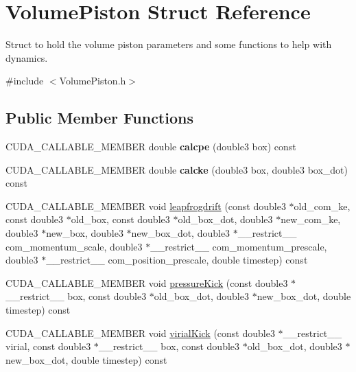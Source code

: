 \hypertarget{structVolumePiston}{}\section{Volume\+Piston Struct Reference}
\label{structVolumePiston}


Struct to hold the volume piston parameters and some functions to help with dynamics.  




{\ttfamily \#include $<$Volume\+Piston.\+h$>$}

\subsection*{Public Member Functions}
\begin{DoxyCompactItemize}
\item 
\hypertarget{structVolumePiston_a739d6b6559f8e7861ed9f606e87cc2d9}{}\label{structVolumePiston_a739d6b6559f8e7861ed9f606e87cc2d9} 
C\+U\+D\+A\+\_\+\+C\+A\+L\+L\+A\+B\+L\+E\+\_\+\+M\+E\+M\+B\+ER double {\bfseries calcpe} (double3 box) const
\item 
\hypertarget{structVolumePiston_ac699322cd986cf421e79efc1bbedc45c}{}\label{structVolumePiston_ac699322cd986cf421e79efc1bbedc45c} 
C\+U\+D\+A\+\_\+\+C\+A\+L\+L\+A\+B\+L\+E\+\_\+\+M\+E\+M\+B\+ER double {\bfseries calcke} (double3 box, double3 box\+\_\+dot) const
\item 
C\+U\+D\+A\+\_\+\+C\+A\+L\+L\+A\+B\+L\+E\+\_\+\+M\+E\+M\+B\+ER void \hyperlink{structVolumePiston_a771864206ceef0f0ae6c07e1639a8d71}{leapfrogdrift} (const double3 $\ast$old\+\_\+com\+\_\+ke, const double3 $\ast$old\+\_\+box, const double3 $\ast$old\+\_\+box\+\_\+dot, double3 $\ast$new\+\_\+com\+\_\+ke, double3 $\ast$new\+\_\+box, double3 $\ast$new\+\_\+box\+\_\+dot, double3 $\ast$\+\_\+\+\_\+restrict\+\_\+\+\_\+ com\+\_\+momentum\+\_\+scale, double3 $\ast$\+\_\+\+\_\+restrict\+\_\+\+\_\+ com\+\_\+momentum\+\_\+prescale, double3 $\ast$\+\_\+\+\_\+restrict\+\_\+\+\_\+ com\+\_\+position\+\_\+prescale, double timestep) const
\item 
C\+U\+D\+A\+\_\+\+C\+A\+L\+L\+A\+B\+L\+E\+\_\+\+M\+E\+M\+B\+ER void \hyperlink{structVolumePiston_ae2ae90b94c4f05a5338a2599a5e12f96}{pressure\+Kick} (const double3 $\ast$\+\_\+\+\_\+restrict\+\_\+\+\_\+ box, const double3 $\ast$old\+\_\+box\+\_\+dot, double3 $\ast$new\+\_\+box\+\_\+dot, double timestep) const
\item 
C\+U\+D\+A\+\_\+\+C\+A\+L\+L\+A\+B\+L\+E\+\_\+\+M\+E\+M\+B\+ER void \hyperlink{structVolumePiston_ab1d3d87cae459ab285f52c694cfa35f0}{virial\+Kick} (const double3 $\ast$\+\_\+\+\_\+restrict\+\_\+\+\_\+ virial, const double3 $\ast$\+\_\+\+\_\+restrict\+\_\+\+\_\+ box, const double3 $\ast$old\+\_\+box\+\_\+dot, double3 $\ast$new\+\_\+box\+\_\+dot, double timestep) const

\end{DoxyCompactItemize}
